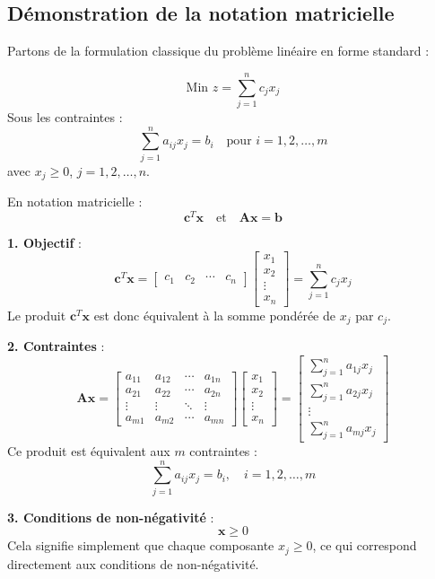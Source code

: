 \documentclass{report}
\begin{document}
\begin{multicols*}{2}
\section{Démonstration de la notation matricielle}

Partons de la formulation classique du problème linéaire en forme standard :

\[
\text{Min } z = \sum_{j=1}^{n} c_j x_j
\]
Sous les contraintes :
\[
\sum_{j=1}^{n} a_{ij} x_j = b_i \quad \text{pour } i = 1, 2, \dots, m
\]
avec \(x_j \geq 0\), \(j = 1, 2, \dots, n\).

En notation matricielle :
\[
\mathbf{c}^T \mathbf{x} \quad \text{et} \quad \mathbf{A} \mathbf{x} = \mathbf{b}
\]

\textbf{1. Objectif} :  
\[
\mathbf{c}^T \mathbf{x} = 
\begin{bmatrix}
c_1 & c_2 & \cdots & c_n
\end{bmatrix}
\begin{bmatrix}
x_1 \\
x_2 \\
\vdots \\
x_n
\end{bmatrix}
= \sum_{j=1}^{n} c_j x_j
\]
Le produit \(\mathbf{c}^T \mathbf{x}\) est donc équivalent à la somme pondérée 
de \(x_j\) par \(c_j\).

\textbf{2. Contraintes} :  
\[
\mathbf{A} \mathbf{x} = 
\begin{bmatrix}
a_{11} & a_{12} & \cdots & a_{1n} \\
a_{21} & a_{22} & \cdots & a_{2n} \\
\vdots & \vdots & \ddots & \vdots \\
a_{m1} & a_{m2} & \cdots & a_{mn}
\end{bmatrix}
\begin{bmatrix}
x_1 \\
x_2 \\
\vdots \\
x_n
\end{bmatrix}
=
\begin{bmatrix}
\sum_{j=1}^{n} a_{1j} x_j \\
\sum_{j=1}^{n} a_{2j} x_j \\
\vdots \\
\sum_{j=1}^{n} a_{mj} x_j
\end{bmatrix}
\]
Ce produit est équivalent aux \(m\) contraintes :
\[
\sum_{j=1}^{n} a_{ij} x_j = b_i, \quad i = 1, 2, \dots, m
\]

\textbf{3. Conditions de non-négativité} :  
\[
\mathbf{x} \geq 0
\]
Cela signifie simplement que chaque composante \(x_j \geq 0\), ce qui correspond 
directement aux conditions de non-négativité.


\end{multicols*}
\end{document}
